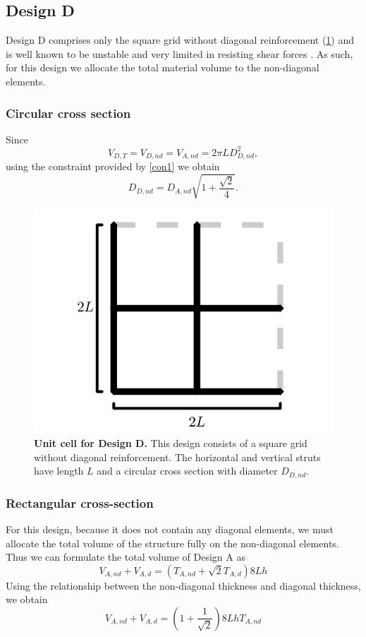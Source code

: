 \documentclass[10pt,twoside]{fernandes_supp}
\begin{document}
\subsection{Design D} 
Design D comprises only the square grid without diagonal reinforcement (\cref{DesignD}) and is well known to be unstable and very limited in resisting shear forces \citep{gibson1999,deshpande2001}. As such, for this design we allocate the total material volume to the non-diagonal elements.

\subsubsection{Circular cross section}
Since
\begin{equation}
V_{D,T}=V_{D,nd}=V_{A,nd}=2\pi L D_{D,nd}^2,
\end{equation}
using the constraint provided by \cref{con1} we obtain
\begin{equation}
{D_{D,nd}}={D_{A,nd}}\sqrt{1+\frac{\sqrt{2}}{4}}. 
\end{equation}

\begin{figure}[H]
    \centering
    \includegraphics[width=0.4\linewidth]{SFig5.png}
    \caption{{\bf Unit cell for Design D.} This design consists of a square grid without diagonal reinforcement.  The horizontal and vertical struts have length $L$ and a circular cross section with diameter $D_{D,nd}$.}
    \label{DesignD}
\end{figure}

\subsubsection{Rectangular cross-section}
For this design, because it does not contain any diagonal elements, we must allocate the total volume of the structure fully on the non-diagonal elements. Thus we can formulate the total volume of Design A as
\begin{equation}
	V_{A,nd}+V_{A,d}=(T_{A,nd}+\sqrt{2}T_{A,d})8Lh
\end{equation}
Using the relationship between the non-diagonal thickness and diagonal thickness, we obtain
\begin{equation}
V_{A,nd}+V_{A,d}=\left(1+\frac{1}{\sqrt{2}}\right)8LhT_{A,nd}
\end{equation}
\end{document}
